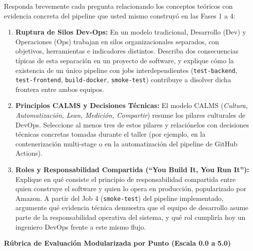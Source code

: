 \documentclass[10pt,letterpaper]{article}
\newcommand{\sectionBadge}[1]{%
  \refstepcounter{section}%
  \vspace{0.24cm}%
  \noindent%
  \colorbox{icesiBlue}{\color{white}\rule[-0.08cm]{0pt}{0.42cm}\hspace{0.16cm}\textbf{\normalsize \thesection}\hspace{0.16cm}}%
  \hspace{0.18cm}%
  {\fontsize{9.5}{12}\selectfont\textbf{\color{icesiDark}#1}}\\[-0.10cm]%
  \noindent{\color{icesiDark}\rule{\textwidth}{0.8pt}}\vspace{0.10cm}%
}
\begin{document}
Responda brevemente cada pregunta relacionando los conceptos teóricos con evidencia concreta del pipeline que usted mismo construyó en las Fases 1 a 4:
\begin{enumerate}[leftmargin=*,label=\textbf{\arabic*.},itemsep=4pt,topsep=3pt]
  \item \textbf{Ruptura de Silos Dev-Ops:} En un modelo tradicional, Desarrollo (Dev) y Operaciones (Ops) trabajan en silos organizacionales separados, con objetivos, herramientas e indicadores distintos. Describa dos consecuencias típicas de esta separación en un proyecto de software, y explique cómo la existencia de un único pipeline con jobs interdependientes (\texttt{test-backend}, \texttt{test-frontend}, \texttt{build-docker}, \texttt{smoke-test}) contribuye a disolver dicha frontera entre ambos equipos.
  \item \textbf{Principios CALMS y Decisiones Técnicas:} El modelo CALMS (\textit{Cultura, Automatización, Lean, Medición, Compartir}) resume los pilares culturales de DevOps. Seleccione al menos tres de estos pilares y relaciónelos con decisiones técnicas concretas tomadas durante el taller (por ejemplo, en la contenerización multi-stage o en la automatización del pipeline de GitHub Actions).
  \item \textbf{Roles y Responsabilidad Compartida (``You Build It, You Run It''):} Explique en qué consiste el principio de responsabilidad compartida entre quien construye el software y quien lo opera en producción, popularizado por Amazon. A partir del Job 4 (\texttt{smoke-test}) del pipeline implementado, argumente qué evidencia técnica demuestra que el equipo de desarrollo asume parte de la responsabilidad operativa del sistema, y qué rol cumpliría hoy un ingeniero DevOps frente a este mismo flujo.
\end{enumerate}

\newpage

\sectionBadge{Rúbrica de Evaluación Modularizada por Punto (Escala 0.0 a 5.0)}
\end{document}
